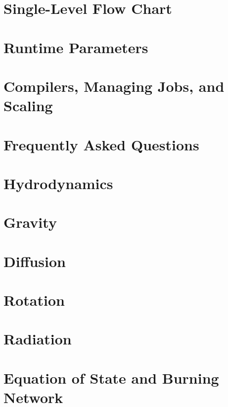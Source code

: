 \documentclass[11pt]{book}
\begin{document}
\chapter{Single-Level Flow Chart}


\chapter{Runtime Parameters}



\chapter{Compilers, Managing Jobs, and Scaling}


\chapter{Frequently Asked Questions}


\chapter{Hydrodynamics}


\chapter{Gravity}


\chapter{Diffusion}


\chapter{Rotation}


\chapter{Radiation}


\chapter{Equation of State and Burning Network}

\end{document}
